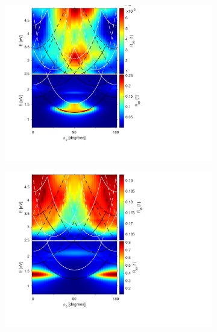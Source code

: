 \begin{figure}  %
    \begin{subfigure}{0.5\textwidth}
        \centering
        \includegraphics[width=\linewidth, trim=1.2cm  1.8cm 6.5cm 0.3cm, clip]{figures/ch4/S5B/contour/S5B_Rpp.pdf}
        \caption{}
        \label{fig:S5B_contour_Rpp}
    \end{subfigure}
    \begin{subfigure}{0.5\textwidth}
        \centering
        \includegraphics[width=\linewidth, trim=1.2cm  1.8cm 6.5cm 0.3cm, clip]{figures/ch4/S5B/contour/S5B_Rss.pdf}
        \caption{}
        \label{fig:S5B_contour_Rss}
    \end{subfigure}
    

\end{figure}
